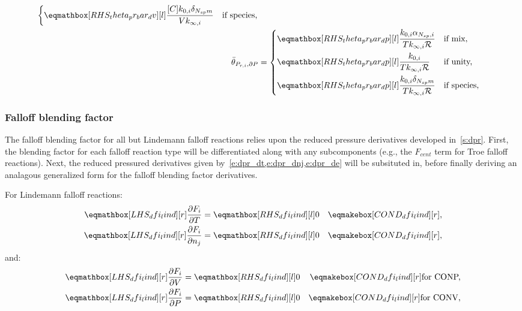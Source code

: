 \documentclass[12pt]{article}
\newcommand{\ns}{N_{sp}}
\newcommand{\conp}{CONP}
\newcommand{\conv}{CONV}
\newcommand{\dconp}{\ifmmode\text{for \conp,}\else for \conp,\fi}
\newcommand{\dconv}{\ifmmode\text{for \conv,}\else for \conv,\fi}
\newcommand{\Ru}{\mathcal{R}}
\begin{document}
\begin{align}
\begin{dcases}
  \rhs{theta_pr_bar_dv}{\frac{[C] k_{0, i} \delta_{\ns m}}{V k_{\infty, i}}} & \text{if species,}
 \end{dcases} \\
 \label{e:dpr_theta_dp}
 \bar{\theta}_{P_{r, i}, \partial P} &=
 \begin{dcases}
  \rhs{theta_pr_bar_dp}{\frac{k_{0, i} \alpha_{\ns,i}}{T k_{\infty, i} \Ru}} & \text{if mix,} \\
  \rhs{theta_pr_bar_dp}{\frac{k_{0, i}}{T k_{\infty, i} \Ru}} & \text{if unity,}  \\
  \rhs{theta_pr_bar_dp}{\frac{k_{0, i} \delta_{\ns m}}{T k_{\infty, i} \Ru}} & \text{if species,}
 \end{dcases}
\end{align}


\subsubsection{Falloff blending factor}
\label{s:dfi}

The falloff blending factor for all but Lindemann falloff reactions relies upon the reduced pressure derivatives developed in~\cref{s:dpr}.
First, the blending factor for each falloff reaction type will be differentiated along with any subcomponents (e.g., the $F_{cent}$ term for Troe falloff reactions).
Next, the reduced pressured derivatives given by~\cref{e:dpr_dt,e:dpr_dnj,e:dpr_de} will be subsituted in, before finally deriving an analagous generalized form for the falloff blending factor derivatives.

For Lindemann falloff reactions:
\begin{align}
 \lhs{dfi_lind}{\frac{\partial F_{i} }{\partial T }} &= \rhs{dfi_lind}{0} & \cond{dfi_lind}{,} \label{e:dfi_lind_dt} \\
 \lhs{dfi_lind}{\frac{\partial F_{i} }{\partial n_j }} &= \rhs{dfi_lind}{0} & \cond{dfi_lind}{,} \label{e:dfi_lind_dnj}
\end{align}
and:
\begin{subequations}
 \label{e:dfi_lind_de}
 \begin{align}
  \lhs{dfi_lind}{\frac{\partial F_{i} }{\partial V }} &= \rhs{dfi_lind}{0} & \cond{dfi_lind}{\dconp} \\
  \lhs{dfi_lind}{\frac{\partial F_{i} }{\partial P }} &= \rhs{dfi_lind}{0} & \cond{dfi_lind}{\dconv}
 \end{align}
\end{subequations}
\end{document}
